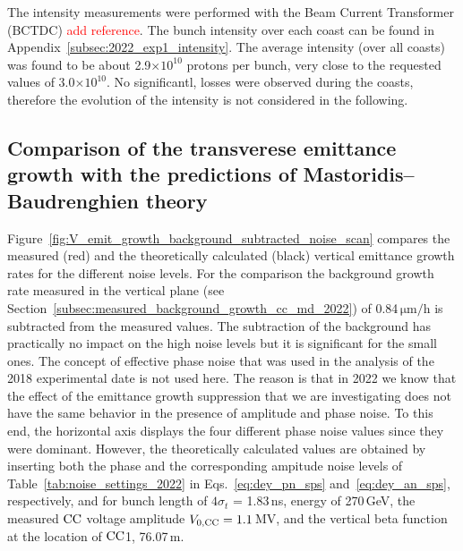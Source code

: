 The intensity measurements were performed with the Beam Current Transformer (BCTDC) \textcolor{red}{add reference}. The bunch intensity over each coast can be found in Appendix~\ref{subsec:2022_exp1_intensity}. The average intensity (over all coasts) was found to be about 2.9$\times 10^{10}$ protons per bunch, very close to the requested values of 3.0$\times 10^{10}$. No significantl, losses were observed during the coasts, therefore the evolution of the intensity is not considered in the following.

\subsection{Comparison of the transverese emittance growth with the predictions of Mastoridis--Baudrenghien theory}\label{sec:cc_exp1_2022_theory_vs_measurements}

Figure~\ref{fig:V_emit_growth_background_subtracted_noise_scan} compares the measured (red) and the theoretically calculated (black) vertical emittance growth rates for the different noise levels. For the comparison the background growth rate measured in the vertical plane (see Section~\ref{subsec:measured_background_growth_cc_md_2022}) of 0.84\,$\mathrm{\mu m /h}$ is subtracted from the measured values. The subtraction of the background has practically no impact on the high noise levels but it is significant for the small ones. The concept of effective phase noise that was used in the analysis of the 2018 experimental date is not used here. The reason is that in 2022 we know that the effect of the emittance growth suppression that we are investigating does not have the same behavior in the presence of amplitude and phase noise. To this end, the horizontal axis displays the four different phase noise values since they were dominant. However, the theoretically calculated values are obtained by inserting both the phase and the corresponding ampitude noise levels of Table~\ref{tab:noise_settings_2022} in Eqs.~\eqref{eq:dey_pn_sps} and~\eqref{eq:dey_an_sps}, respectively, and for bunch length of $4 \sigma_t$ = 1.83\,ns, energy of 270\,GeV, the measured ${\mathrm{CC}}$ voltage amplitude ${V_\mathrm{0, CC}}=1.1$\,MV, and the vertical beta function at the location of ${\mathrm{CC}}$1, 76.07\,m.


